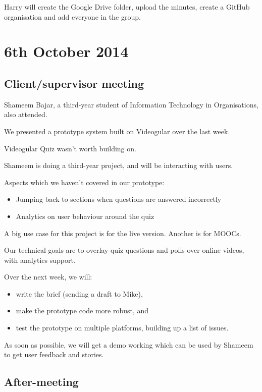 Harry will create the Google Drive folder, upload the minutes, create a
GitHub organisation and add everyone in the group.

\section{6th October 2014}\label{Minutes:2014-10-06}

\subsection{Client/supervisor meeting}

Shameem Bajar, a third-year student of Information Technology in
Organisations, also attended.

We presented a prototype system built on Videogular over the last week.

Videogular Quiz wasn't worth building on.

Shameem is doing a third-year project, and will be interacting with
users.

Aspects which we haven't covered in our prototype:

\begin{itemize}
\itemsep1pt\parskip0pt
\item
  Jumping back to sections when questions are answered incorrectly
\item
  Analytics on user behaviour around the quiz
\end{itemize}

A big use case for this project is for the live version. Another is for
MOOCs.

Our technical goals are to overlay quiz questions and polls over online
videos, with analytics support.

Over the next week, we will:

\begin{itemize}
\itemsep1pt\parskip0pt
\item
  write the brief (sending a draft to Mike),
\item
  make the prototype code more robust, and
\item
  test the prototype on multiple platforms, building up a list of
  issues.
\end{itemize}

As soon as possible, we will get a demo working which can be used by
Shameem to get user feedback and stories.

\subsection{After-meeting}

